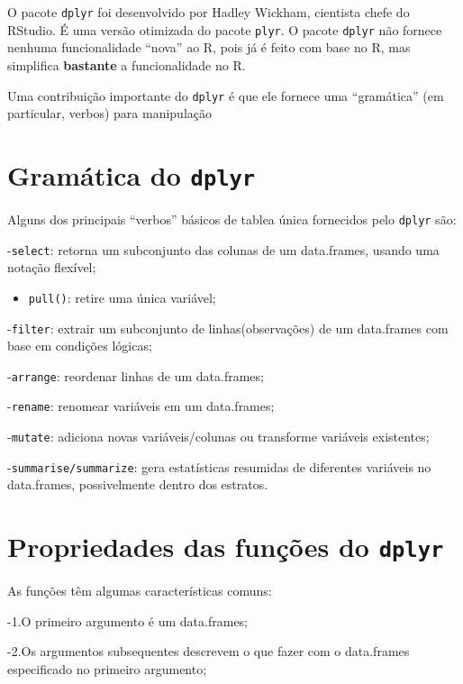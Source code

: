 \documentclass[]{book}
\providecommand{\tightlist}{%
  \setlength{\itemsep}{0pt}\setlength{\parskip}{0pt}}
\begin{document}
O pacote \texttt{dplyr} foi desenvolvido por Hadley Wickham, cientista chefe do RStudio. É uma versão otimizada do pacote \texttt{plyr}. O pacote \texttt{dplyr} não fornece nenhuma funcionalidade ``nova'' ao R, pois já é feito com base no R, mas simplifica \textbf{bastante} a funcionalidade no R.

Uma contribuição importante do \texttt{dplyr} é que ele fornece uma ``gramática'' (em particular, verbos) para manipulação

\hypertarget{gramatica-do-dplyr}{%
\section{\texorpdfstring{Gramática do \texttt{dplyr}}{Gramática do dplyr}}\label{gramatica-do-dplyr}}

Alguns dos principais ``verbos'' básicos de tablea única fornecidos pelo \texttt{dplyr} são:

-\texttt{select}: retorna um subconjunto das colunas de um data.frames, usando uma notação flexível;

\begin{itemize}
\tightlist
\item
  \texttt{pull()}: retire uma única variável;
\end{itemize}

-\texttt{filter}: extrair um subconjunto de linhas(observações) de um data.frames com base em condições lógicas;

-\texttt{arrange}: reordenar linhas de um data.frames;

-\texttt{rename}: renomear variáveis em um data.frames;

-\texttt{mutate}: adiciona novas variáveis/colunas ou transforme variáveis existentes;

-\texttt{summarise/summarize}: gera estatísticas resumidas de diferentes variáveis no data.frames, possivelmente dentro dos estratos.

\hypertarget{propriedades-das-funcoes-do-dplyr}{%
\section{\texorpdfstring{Propriedades das funções do \texttt{dplyr}}{Propriedades das funções do dplyr}}\label{propriedades-das-funcoes-do-dplyr}}

As funções têm algumas características comuns:

-1.O primeiro argumento é um data.frames;

-2.Os argumentos subsequentes descrevem o que fazer com o data.frames especificado no primeiro argumento;
\end{document}
